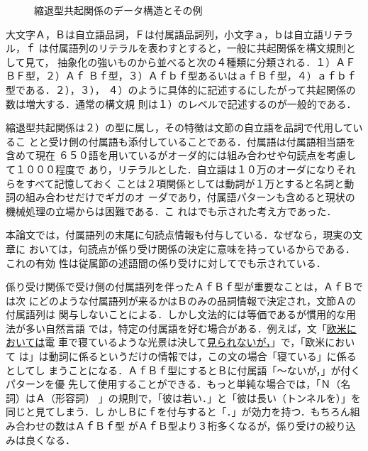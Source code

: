 \begin{figure} [htb]
\begin{center}
\caption{縮退型共起関係のデータ構造とその例} \label{データ構造}
\end{center}
\end{figure}

大文字Ａ，Ｂは自立語品詞，Ｆは付属語品詞列，小文字ａ，ｂは自立語リテラル，ｆ
は付属語列のリテラルを表わすとすると，一般に共起関係を構文規則として見て，
抽象化の強いものから並べると次の４種類に分類される．１）ＡＦＢＦ型，２）Ａｆ
Ｂｆ型，３）Ａｆｂｆ型あるいはａｆＢｆ型，４）ａｆｂｆ型である．２），３），
４）のように具体的に記述するにしたがって共起関係の数は増大する．通常の構文規
則は１）のレベルで記述するのが一般的である．

縮退型共起関係は２）の型に属し，その特徴は文節の自立語を品詞で代用しているこ
とと受け側の付属語も添付していることである．付属語は付属語相当語を含めて現在
６５０語を用いているがオーダ的には組み合わせや句読点を考慮して１０００程度で
あり，リテラルとした．自立語は１０万のオーダになりそれらをすべて記憶しておく
ことは２項関係としては動詞が１万とすると名詞と動詞の組み合わせだけでギガのオ
ーダであり，付属語パターンも含めると現状の機械処理の立場からは困難である．こ
れは\cite{Yoshida1972}でも示された考え方であった．

本論文では，付属語列の末尾に句読点情報も付与している．なぜなら，現実の文章に
おいては，句読点が係り受け関係の決定に意味を持っているからである．これの有効
性は従属節の述語間の係り受けに対して\cite{Shirai1995}でも示されている．

係り受け関係で受け側の付属語列を伴ったＡｆＢｆ型が重要なことは，ＡｆＢでは次
にどのような付属語列が来るかはＢのみの品詞情報で決定され，文節Ａの付属語列は
関与しないことによる．しかし文法的には等価であるが慣用的な用法が多い自然言語
では，特定の付属語を好む場合がある．例えば，文「\underline{欧米においては}電
車で寝ているような光景は決して\underline{見られないが，}」で，「欧米において
は」は動詞に係るというだけの情報では，この文の場合「寝ている」に係るとしてし
まうことになる．ＡｆＢｆ型にするとＢに付属語「〜ないが，」が付くパターンを優
先して使用することができる．もっと単純な場合では，「Ｎ（名詞）はＡ（形容詞）
」の規則で，「彼は若い．」と「彼は長い（トンネルを）」を同じと見てしまう．し
かしＢにｆを付与すると「．」が効力を持つ．もちろん組み合わせの数はＡｆＢｆ型
がＡｆＢ型より３桁多くなるが，係り受けの絞り込みは良くなる．

